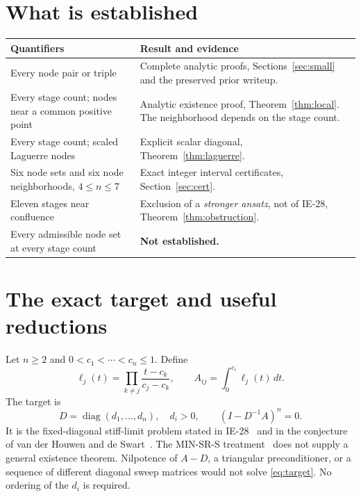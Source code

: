 \documentclass[11pt]{article}
\theoremstyle{remark}\newtheorem{remark}[theorem]{Remark}
\DeclareMathOperator{\diag}{diag}\DeclareMathOperator{\tr}{tr}
\begin{document}
\section*{What is established}
\begin{tabular}{@{}p{}p{}@{}}
\toprule
Quantifiers & Result and evidence \\
\midrule
Every node pair or triple & Complete analytic proofs, Sections~\ref{sec:small} and the preserved prior writeup.\\
Every stage count; nodes near a common positive point & Analytic existence proof, Theorem~\ref{thm:local}. The neighborhood depends on the stage count.\\
Every stage count; scaled Laguerre nodes & Explicit scalar diagonal, Theorem~\ref{thm:laguerre}.\\
Six node sets and six node neighborhoods, $4\le n\le7$ & Exact integer interval certificates, Section~\ref{sec:cert}.\\
Eleven stages near confluence & Exclusion of a \emph{stronger ansatz}, not of IE-28, Theorem~\ref{thm:obstruction}.\\
Every admissible node set at every stage count & \textbf{Not established.}\\
\bottomrule
\end{tabular}

\bigskip
{\small\tableofcontents}
\newpage
\section{The exact target and useful reductions}\label{sec:target}
Let $n\ge2$ and $0<c_1<\cdots<c_n\le1$. Define
\begin{equation}\label{eq:A}
 \ell_j(t)=\prod_{k\ne j}\frac{t-c_k}{c_j-c_k},\qquad
 A_{ij}=\int_0^{c_i}\ell_j(t)\,dt.
\end{equation}
The target is
\begin{equation}\label{eq:target}
 D=\diag(d_1,\ldots,d_n),\quad d_i>0,\qquad
 (I-D^{-1}A)^n=0.
\end{equation}
It is the fixed-diagonal stiff-limit problem stated in IE-28~\cite{entry} and
in the conjecture of van der Houwen and de Swart~\cite[Section 3.2.1]{houwen}.
The MIN-SR-S treatment~\cite[Section 2.2.3]{sdc} does not supply a general
existence theorem. Nilpotence of $A-D$, a triangular preconditioner, or a
sequence of different diagonal sweep matrices would not solve
\eqref{eq:target}. No ordering of the $d_i$ is required.
\end{document}
